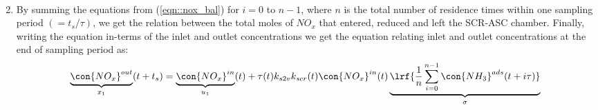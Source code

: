 \begin{enumerate}
\begin{multline}
                        \label{eqn::ads_bal}
                \end{multline}
        \item By summing the equations from (\ref{eqn::nox_bal}) for  $i = 0$ to $n-1$, where $n$ is the total number of residence times within one sampling period $(= t_s/\tau)$, we get the relation between the total moles of $NO_x$ that entered, reduced and left the SCR-ASC chamber. Finally, writing the equation in-terms of the inlet and outlet concentrations we get the equation relating inlet and outlet concentrations at the end of sampling period as:
                \begin{multline}
                        \underbrace{\con{NO_x}^{out}}_{x_1}(t + t_s) =
                                \underbrace{\con{NO_x}^{in}}_{u_1}(t) + \tau(t) k_{s2v} k_{scr}(t) \con{NO_x}^{in}(t) \underbrace{\lrf{\frac{1}{n} \sum_{i = 0}^{n-1} \con{NH_3}^{ads}(t + i \tau)}}_{\sigma}
                        \label{eqn::nox_avg}
                \end{multline}


\end{enumerate}
